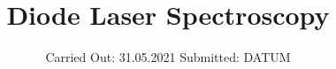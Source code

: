 



\subject{V60}  %
\title{Diode Laser Spectroscopy} %
\date{%
  Carried Out: 31.05.2021
  \hspace{3em}
  Submitted: DATUM
}



\maketitle
\thispagestyle{empty}
\tableofcontents
\newpage




%
%

\printbibliography{}


